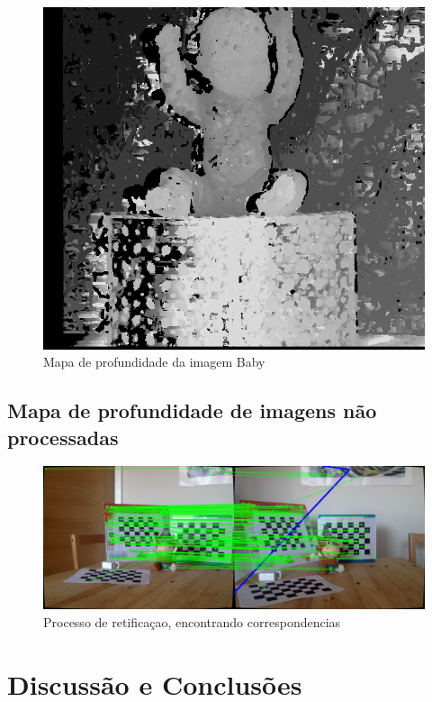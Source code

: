 \documentclass[conference]{IEEEtran}
\begin{document}
\begin{figure}[ht!]\label{babyDepth}
\begin{center}
\includegraphics[width= .85\columnwidth]{babyDepth.png}
\caption{Mapa de profundidade da imagem Baby}
\end{center}
\end{figure}

\subsection{Mapa de profundidade de imagens não processadas}

\begin{figure}[ht!]\label{retificacao}
\begin{center}
\includegraphics[width= .85\columnwidth]{retificacao.png}
\caption{Processo de retificaçao, encontrando correspondencias}
\end{center}
\end{figure}

\section{Discussão e Conclusões}




\end{document}
